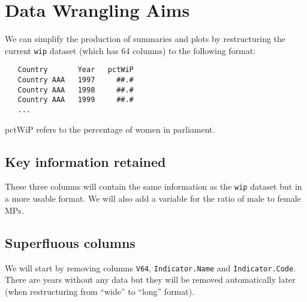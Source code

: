 \documentclass[a4paper,9pt,twocolumn,twoside,printwatermark=true]{pinp}
\begin{document}
\begin{Shaded}
\begin{Highlighting}[]
\StringTok{ }\NormalTok{(}
\NormalTok{(}
\NormalTok{(}
\end{Highlighting}
\end{Shaded}

\section{Data Wrangling Aims}\label{data-wrangling-aims}

We can simplify the production of summaries and plots by restructuring
the current \texttt{wip} dataset (which has 64 columns) to the following
format:

\begin{verbatim}
   Country       Year   pctWiP
   Country AAA   1997     ##.#
   Country AAA   1998     ##.#
   Country AAA   1999     ##.#
   ...
\end{verbatim}

pctWiP refers to the percentage of women in parliament.

\subsection{Key information retained}\label{key-information-retained}

These three columns will contain the same information as the
\texttt{wip} dataset but in a more usable format. We will also add a
variable for the ratio of male to female MPs.

\subsection{Superfluous columns}\label{superfluous-columns}

We will start by removing columns \texttt{V64}, \texttt{Indicator.Name}
and \texttt{Indicator.Code}. There are years without any data but they
will be removed automatically later (when restructuring from ``wide'' to
``long'' format).
\end{document}
